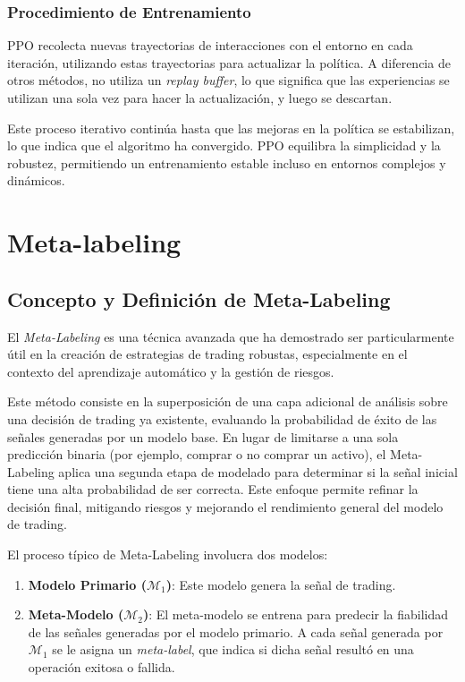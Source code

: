 \documentclass[a4paper,12pt, twoside]{report}
\begin{document}
\subsubsection{Procedimiento de Entrenamiento}

PPO recolecta nuevas trayectorias de interacciones con el entorno en cada iteración, 
utilizando estas trayectorias para actualizar la política. A diferencia de otros métodos, 
no utiliza un \textit{replay buffer}, lo que significa que las experiencias se utilizan 
una sola vez para hacer la actualización, y luego se descartan.

Este proceso iterativo continúa hasta que las mejoras en la política se estabilizan, 
lo que indica que el algoritmo ha convergido. PPO equilibra la simplicidad y la robustez, 
permitiendo un entrenamiento estable incluso en entornos complejos y dinámicos.


\section{Meta-labeling}

\subsection{Concepto y Definición de Meta-Labeling}


El \textit{Meta-Labeling} es una técnica avanzada que ha demostrado ser particularmente útil
en la creación de estrategias de trading robustas, especialmente en el contexto del aprendizaje
automático y la gestión de riesgos. 

Este método consiste en la superposición de una capa
adicional de análisis sobre una decisión de trading ya existente, evaluando la probabilidad 
de éxito de las señales generadas por un modelo base. En lugar de limitarse
a una sola predicción binaria (por ejemplo, comprar o no comprar un activo), el Meta-
Labeling aplica una segunda etapa de modelado para determinar si la señal inicial tiene
una alta probabilidad de ser correcta. Este enfoque permite refinar la decisión final,
mitigando riesgos y mejorando el rendimiento general del modelo de trading.

El proceso típico de Meta-Labeling involucra dos modelos:
\begin{enumerate}
    \item \textbf{Modelo Primario ($\mathcal{M}_1$)}: Este modelo genera la señal de 
    trading.
    \item \textbf{Meta-Modelo ($\mathcal{M}_2$)}: El meta-modelo se entrena para 
    predecir la fiabilidad de las señales generadas por el modelo primario. A cada 
    señal generada por $\mathcal{M}_1$ se le asigna un \textit{meta-label}, que 
    indica si dicha señal resultó en una operación exitosa o fallida.
\end{enumerate}
\end{document}

